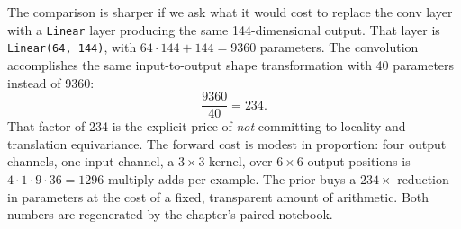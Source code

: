 The comparison is sharper if we ask what it would cost to replace the conv
layer with a \texttt{Linear} layer producing the same 144-dimensional output.
That layer is \texttt{Linear(64, 144)}, with $64 \cdot 144 + 144 = 9360$
parameters. The convolution accomplishes the same input-to-output shape
transformation with 40 parameters instead of 9360:
\begin{equation}\label{eq:conv-params}
  \frac{9360}{40} = 234.
\end{equation}
That factor of 234 is the explicit price of \emph{not} committing to locality
and translation equivariance. The forward cost is modest in proportion: four
output channels, one input channel, a $3 \times 3$ kernel, over $6 \times 6$
output positions is $4 \cdot 1 \cdot 9 \cdot 36 = 1296$ multiply-adds per
example. The prior buys a $234\times$ reduction in parameters at the cost of a
fixed, transparent amount of arithmetic. Both numbers are regenerated by the
chapter's paired notebook.
